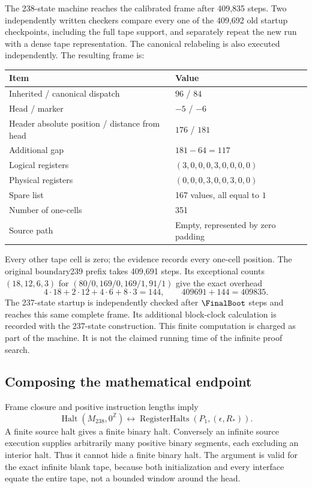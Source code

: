 \documentclass[11pt,letterpaper]{article}
\theoremstyle{definition}\newtheorem{definition}[theorem]{Definition}
\newcommand{\Halt}{\operatorname{Halt}}
\newcommand{\blank}{0^{\mathbb Z}}
\begin{document}
The 238-state machine reaches the calibrated frame after 409,835 steps.
Two independently written checkers compare every one of the 409,692 old
startup checkpoints, including the full tape support, and separately
repeat the new run with a dense tape representation.  The canonical
relabeling is also executed independently.  The resulting frame is:
\begin{center}
\begin{tabular}{ll}
\toprule
Item & Value\\\midrule
Inherited / canonical dispatch & $96$ / $84$\\
Head / marker & $-5$ / $-6$\\
Header absolute position / distance from head & $176$ / $181$\\
Additional gap & $181-64=117$\\
Logical registers & $(3,0,0,0,3,0,0,0,0)$\\
Physical registers & $(0,0,0,3,0,0,3,0,0)$\\
Spare list & 167 values, all equal to $1$\\
Number of one-cells & 351\\
Source path & Empty, represented by zero padding\\
\bottomrule
\end{tabular}
\end{center}
Every other tape cell is zero; the evidence records every one-cell
position.  The original boundary239 prefix takes 409,691 steps.  Its
exceptional counts $(18,12,6,3)$ for $(80/0,169/0,169/1,91/1)$ give the
exact overhead
\[
 4\cdot18+2\cdot12+4\cdot6+8\cdot3=144,
 \qquad409691+144=409835.
\]
\ifFurtherReduction
The 237-state startup is independently checked after $\FinalBoot$ steps
and reaches this same complete frame.  Its additional block-clock
calculation is recorded with the 237-state construction.
\fi
This finite computation is charged as part of the machine.  It is not
the claimed running time of the infinite proof search.

\subsection{Composing the mathematical endpoint}

Frame closure and positive instruction lengths imply
\[
 \Halt(M_{238},\blank)
 \longleftrightarrow
 \operatorname{RegisterHalts}(P_1,(\epsilon,R_*)).
 \tag{R238}
\]
A finite source halt gives a finite binary halt.  Conversely an infinite
source execution supplies arbitrarily many positive binary segments,
each excluding an interior halt.  Thus it cannot hide a finite binary
halt.  The argument is valid for the exact infinite blank tape, because
both initialization and every interface equate the entire tape, not a
bounded window around the head.
\end{document}
